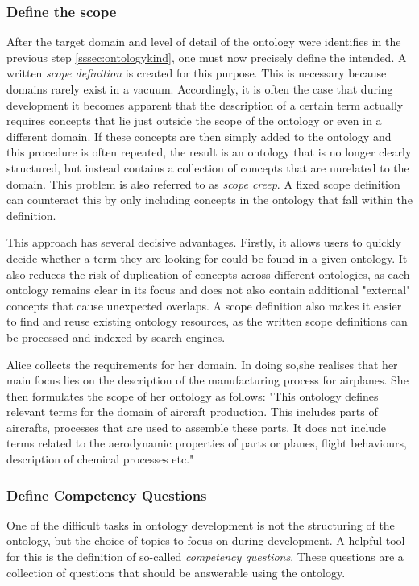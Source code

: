 \subsubsection{Define the scope}


After the target domain and level of detail of the ontology were identifies in the previous step \ref{sssec:ontologykind}, one must now precisely define the intended. A written \textit{scope definition} is created for this purpose. This is necessary because domains rarely exist in a vacuum. Accordingly, it is often the case that during development it becomes apparent that the description of a certain term actually requires concepts that lie just outside the scope of the ontology or even in a different domain. If these concepts are then simply added to the ontology and this procedure is often repeated, the result is an ontology that is no longer clearly structured, but instead contains a collection of concepts that are unrelated to the domain. This problem is also referred to as \textit{scope creep}. A fixed scope definition can counteract this by only including concepts in the ontology that fall within the definition.

This approach has several decisive advantages. Firstly, it allows users to quickly decide whether a term they are looking for could be found in a given ontology. It also reduces the risk of duplication of concepts across different ontologies, as each ontology remains clear in its focus and does not also contain additional "external" concepts that cause unexpected overlaps. A scope definition also makes it easier to find and reuse existing ontology resources, as the written scope definitions can be processed and indexed by search engines.

\begin{example}

Alice collects the requirements for her domain. In doing so,she realises that her main focus lies on the description of the manufacturing process for airplanes. She then formulates the scope of her ontology as follows: "This ontology defines relevant terms for the domain of aircraft production. This includes parts of aircrafts, processes that are used to assemble these parts. It does not include terms related to the aerodynamic properties of parts or planes, flight behaviours, description of chemical processes etc."

\end{example}

\subsubsection{Define Competency Questions}

One of the difficult tasks in ontology development is not the structuring of the ontology, but the choice of topics to focus on during development. A helpful tool for this is the definition of so-called \textit{competency questions}. These questions are a collection of questions that should be answerable using the ontology.

\begin{example}
\end{example}